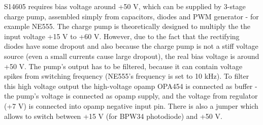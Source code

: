 \par
S14605 requires bias voltage around +50 V, which can be supplied by 3-stage charge pump, assembled simply from capacitors, diodes and PWM generator - for example NE555. The charge pump is theoretically designed to multiply the the input voltage +15 V to +60 V. However, due to the fact that the rectifying diodes have some dropout and also   because the charge pump is not a stiff voltage source (even a small currents cause large dropout), the real bias voltage is around +50 V. The pump's output has to be filtered, because it can contain voltage spikes from switching frequency (NE555's frequency is set to 10 kHz). To filter this high voltage output the high-voltage opamp OPA454 is connected as buffer - the pump's voltage is connected as opamp supply, and the voltage from regulator (+7 V) is connected into opamp negative input pin. There is also a jumper which allows to switch between +15 V (for BPW34 photodiode) and +50 V.

